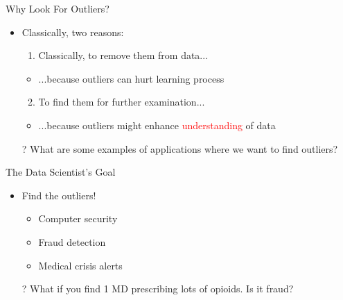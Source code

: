 \documentclass[aspectratio=169]{beamer}
\begin{document}
\begin{frame}{Why Look For Outliers?}

\begin{itemize}
	\item Classically, two reasons:
        		\begin{enumerate}
		\item  Classically, to remove them from data...
		\end{enumerate}
      		 \begin{itemize}
		\item ...because outliers can hurt learning process
        		\end{itemize}
        		\begin{enumerate}
		\setcounter{enumi}{1}
		\item  To find them for further examination...
		\end{enumerate}
        		\begin{itemize}
		\item ...because outliers might enhance \textcolor{red}{understanding} of data
        		\end{itemize}
        \item[?] What are some examples of applications where we want to find outliers?
\end{itemize}

\end{frame}
\begin{frame}{The Data Scientist's Goal}

\begin{itemize}
	\item Find the outliers!
        \begin{itemize}
	\item Computer security
	\item Fraud detection
	\item Medical crisis alerts
        \end{itemize}
\item[?] What if you find 1 MD prescribing lots of opioids. Is it fraud?
\end{itemize}



\end{frame}
\end{document}
